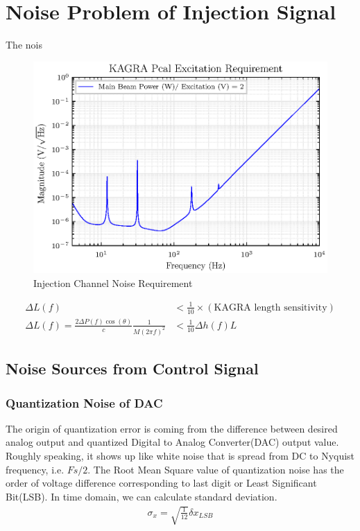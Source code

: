 \clearpage
\section{Noise Problem of Injection Signal}

The nois


\begin{figure}[hbt!]
\centering
\includegraphics[width=.9\textwidth]{figure/DAC_requirement.eps}
\caption{Injection Channel Noise Requirement}\label{fig:DAC_noise_requirement}
\end{figure}

\begin{align}
   \Delta L(f) &< \frac{1}{10} \times (\text{KAGRA length sensitivity})\\
   \Delta L(f) =\frac{2 \Delta P(f) \cos(\theta)}{c} \frac{1}{M(2 \pi f)^2} &< \frac{1}{10} \Delta h(f) L
\end{align}




\subsection{Noise Sources from Control Signal}
\subsubsection{Quantization Noise of DAC}


The origin of quantization error is coming from the difference between desired analog output and quantized Digital to Analog Converter(DAC) output value. Roughly speaking, it shows up like white noise that is spread from DC to Nyquist frequency, i.e. $Fs/2$.
The Root Mean Square value of quantization noise has the order of voltage difference corresponding to last digit or Least Significant Bit(LSB). In time domain, we can calculate standard deviation.
\begin{align}
   \sigma_x = \sqrt{\frac{1}{12}} \delta x_{LSB}
\end{align}

